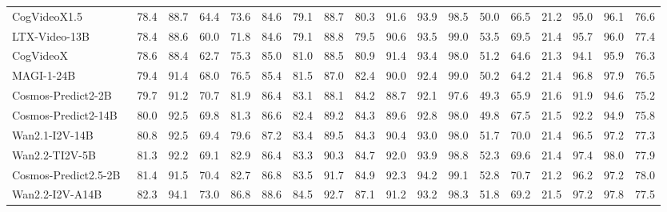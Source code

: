 \begin{table}[t]
{\begin{tabular}{@{}l|c|ccccccc|ccccccccc@{}}
\; CogVideoX1.5~\cite{yang2025cogvideoxtexttovideodiffusionmodels} & 78.4 & 88.7 & 64.4 & 73.6 & 84.6 & 79.1 & 88.7 & 80.3 & 91.6 & 93.9 & 98.5 & 50.0 & 66.5 & 21.2 & 95.0 & 96.1 & 76.6 \\
\; LTX-Video-13B~\cite{HaCohen2024LTXVideo} & 78.4 & 88.6 & 60.0 & 71.8 & 84.6 & 79.1 & 88.8 & 79.5 & 90.6 & 93.5 & 99.0 & \cellcolor{lightblue!25}53.5 & 69.5 & 21.4 & 95.7 & 96.0 & 77.4 \\
\; CogVideoX~\cite{yang2025cogvideoxtexttovideodiffusionmodels} & 78.6 & 88.4 & 62.7 & 75.3 & 85.0 & 81.0 & 88.5 & 80.9 & 91.4 & 93.4 & 98.0 & 51.2 & 64.6 & 21.3 & 94.1 & 95.9 & 76.3 \\
\; MAGI-1-24B~\cite{ai2025magi1autoregressivevideogeneration} & 79.4 & 91.4 & 68.0 & 76.5 & 85.4 & 81.5 & 87.0 & 82.4 & 90.0 & 92.4 & 99.0 & 50.2 & 64.2 & 21.4 & 96.8 & 97.9 & 76.5 \\
\; Cosmos-Predict2-2B~\cite{liu2025world} & 79.7 & 91.2 & 70.7 & 81.9 & 86.4 & 83.1 & 88.1 & 84.2 & 88.7 & 92.1 & 97.6 & 49.3 & 65.9 & \cellcolor{lightblue!25}21.6 & 91.9 & 94.6 & 75.2 \\
\; Cosmos-Predict2-14B~\cite{liu2025world} & 80.0 & 92.5 & 69.8 & 81.3 & 86.6 & 82.4 & 89.2 & 84.3 & 89.6 & 92.8 & 98.0 & 49.8 & 67.5 & 21.5 & 92.2 & 94.9 & 75.8 \\
\; Wan2.1-I2V-14B~\cite{wan2025} & 80.8 & 92.5 & 69.4 & 79.6 & 87.2 & 83.4 & 89.5 & 84.3 & 90.4 & 93.0 & 98.0 & 51.7 & 70.0 & 21.4 & 96.5 & 97.2 & 77.3 \\
\; Wan2.2-TI2V-5B~\cite{wan2025} & 81.3 & 92.2 & 69.1 & 82.9 & 86.4 & 83.3 & 90.3 & 84.7 & 92.0 & 93.9 & 98.8 & 52.3 & 69.6 & 21.4 & 97.4 & 98.0 & 77.9 \\
\; Cosmos-Predict2.5-2B~\cite{liu2025world} & 81.4 & 91.5 & 70.4 & 82.7 & 86.8 & 83.5 & 91.7 & 84.9 & 92.3 & 94.2 & 99.1 & 52.8 & 70.7 & 21.2 & 96.2 & 97.2 & \cellcolor{lightblue!25}78.0 \\
\; Wan2.2-I2V-A14B~\cite{wan2025} & \cellcolor{lightblue!25}82.3 & \cellcolor{lightblue!25}94.1 & \cellcolor{lightblue!25}73.0 & \cellcolor{lightblue!25}86.8 & \cellcolor{lightblue!25}88.6 & \cellcolor{lightblue!25}84.5 & \cellcolor{lightblue!25}92.7 & \cellcolor{lightblue!25}87.1 & 91.2 & 93.2 & 98.3 & 51.8 & 69.2 & 21.5 & 97.2 & 97.8 & 77.5 \\
  \bottomrule
  \end{tabular} %
  }
  \label{tab:predict_results}
  \vspace{-3pt}
\end{table}
